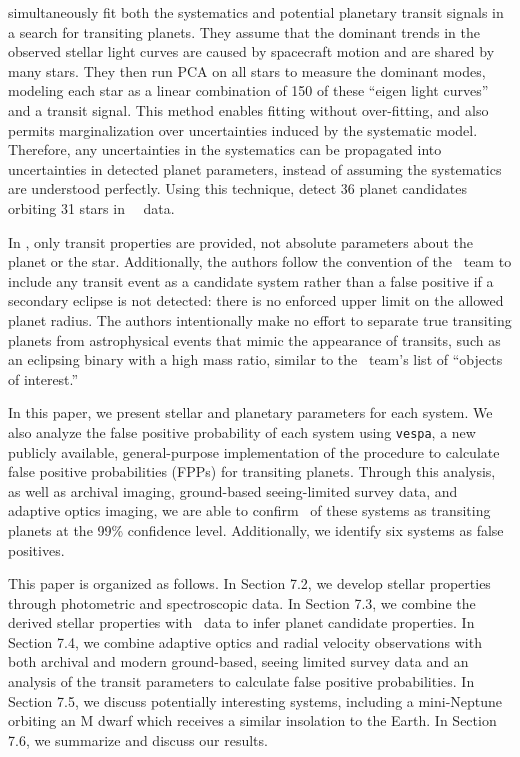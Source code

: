 \paperit{} simultaneously fit both the systematics and potential planetary transit signals
in a search for transiting planets.
They assume that the dominant trends in the observed stellar light
curves are caused by spacecraft motion and are shared by many stars.
They then run PCA on all stars to measure the dominant modes, modeling each star as a
linear combination of 150 of these ``eigen light curves'' and a transit signal.
This method enables fitting without over-fitting, and also permits marginalization over
uncertainties induced by the systematic model.
Therefore, any uncertainties in the systematics can be propagated into uncertainties in
detected planet parameters, instead of assuming the systematics are understood perfectly.
Using this technique, \paperit{} detect 36 planet candidates orbiting 31 stars in \KT\
\Ci\ data.

In \paperit, only transit properties are provided, not absolute parameters about the
planet or the star.
Additionally, the authors follow the convention of the \kep\ team to include any
transit event as a candidate system rather than a false positive if a secondary eclipse
is not detected: there is no enforced upper limit on the allowed planet radius.
The authors intentionally make no effort to separate true transiting planets from
astrophysical events that mimic the appearance of transits, such as an eclipsing
binary with a high mass ratio, similar to the \kep\ team's list of ``objects of interest.''


In this paper, we present stellar and planetary parameters for each system.
We also analyze the false positive probability of each system using \texttt{vespa},
a new publicly available, general-purpose implementation
of the \citet{Morton12} procedure
to calculate false positive probabilities (FPPs) for transiting planets.
Through this analysis, as well as archival imaging, ground-based
seeing-limited survey data, and adaptive optics imaging, we are able to confirm
\Nvalidated\ of these systems as transiting planets at the 99\% confidence
level.
Additionally, we identify six systems as false positives.

This paper is organized as follows.
In Section 7.2, we develop stellar properties through
photometric and spectroscopic data.
In Section 7.3, we combine the derived stellar properties with \KT\ data to infer planet
candidate properties.
In Section 7.4, we combine adaptive optics and radial velocity observations with both
archival and modern ground-based, seeing limited survey data and an analysis of the
transit parameters to calculate false positive probabilities.
In Section 7.5, we discuss potentially interesting systems, including a mini-Neptune
orbiting an M dwarf which receives a similar insolation to the Earth.
In Section 7.6, we summarize and discuss our results.


